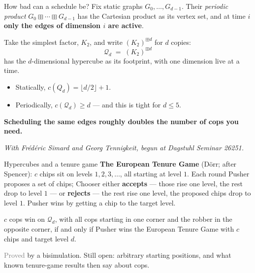 \documentclass[10pt, compress]{beamer}
\begin{document}
\begin{frame}{How bad can a schedule be?}
Fix static graphs $G_0, \dots, G_{d-1}$. Their \emph{periodic product} $G_0 \boxplus \cdots \boxplus G_{d-1}$ has the Cartesian product as its vertex set, and at time $i$ \textbf{only the edges of dimension $i$ are active}.

\medskip

Take the simplest factor, $K_2$, and write $(K_2)^{\boxplus d}$ for $d$ copies:
\[
  \mathcal{Q}_d \;=\; (K_2)^{\boxplus d}
\]
has the $d$-dimensional hypercube as its footprint, with one dimension live at a time.

\medskip

\begin{itemize}
\item Statically, $c(Q_d) = \lfloor d/2 \rfloor + 1$.
\item Periodically, $c(\mathcal{Q}_d) \geq d$ --- and this is tight for $d \leq 5$.
\end{itemize}

\medskip

\textbf{Scheduling the same edges roughly doubles the number of cops you need.}

\medskip

\textit{\small With Fr\'ed\'eric Simard and Georg Tennigkeit, begun at Dagstuhl Seminar 26251.}
\end{frame}


\begin{frame}{Hypercubes and a tenure game}
\textbf{The European Tenure Game} (D\"orr; after Spencer): $c$ chips sit on levels $1, 2, 3, \dots$, all starting at level $1$. Each round Pusher proposes a set of chips; Chooser either \textbf{accepts} --- those rise one level, the rest drop to level $1$ --- or \textbf{rejects} --- the rest rise one level, the proposed chips drop to level $1$. Pusher wins by getting a chip to the target level.

\bigskip

\begin{theorem}
$c$ cops win on $\mathcal{Q}_d$, with all cops starting in one corner and the robber in the opposite corner, if and only if Pusher wins the European Tenure Game with $c$ chips and target level $d$.
\end{theorem}

\medskip

{\small \textcolor{gray}{Proved} by a bisimulation. Still open: arbitrary starting positions, and what known tenure-game results then say about cops.}
\end{frame}
\end{document}
